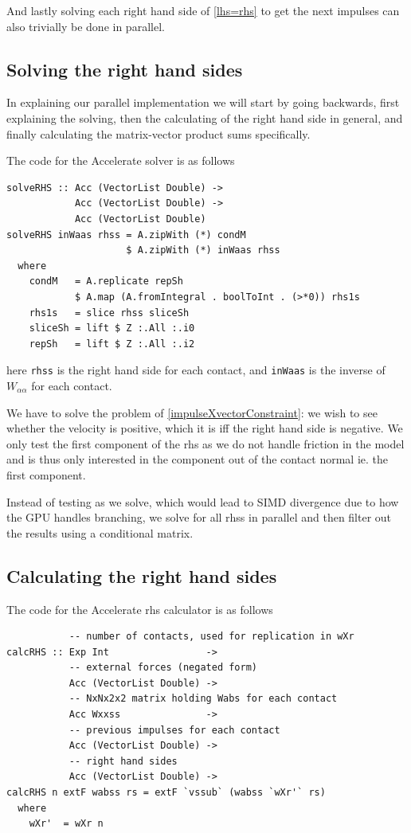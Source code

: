 \documentclass[runningheads,a4paper]{llncs}
\begin{document}
And lastly solving each right hand side of \eqref{lhs=rhs}
to get the next impulses can also trivially be done in parallel.

\subsection{Solving the right hand sides}
In explaining our parallel implementation we will start
by going backwards, first explaining the solving,
then the calculating of the right hand side in general,
and finally calculating the matrix-vector product sums specifically.

The code for the Accelerate solver is as follows
\begin{verbatim}
solveRHS :: Acc (VectorList Double) -> 
            Acc (VectorList Double) -> 
            Acc (VectorList Double)
solveRHS inWaas rhss = A.zipWith (*) condM 
                     $ A.zipWith (*) inWaas rhss
  where
    condM   = A.replicate repSh 
            $ A.map (A.fromIntegral . boolToInt . (>*0)) rhs1s
    rhs1s   = slice rhss sliceSh
    sliceSh = lift $ Z :.All :.i0
    repSh   = lift $ Z :.All :.i2
\end{verbatim}
here \texttt{rhss} is the right hand side for each contact,
and \texttt{inWaas} is the inverse of $W_{\alpha\alpha}$ for each contact.

We have to solve the problem of \eqref{impulseXvectorConstraint}:
we wish to see whether the velocity is positive,
which it is iff the right hand side is negative.
We only test the first component of the rhs
as we do not handle friction in the model and is thus only interested
in the component out of the contact normal ie. the first component.

Instead of testing as we solve,
which would lead to SIMD divergence due to how the GPU handles branching,
we solve for all rhss in parallel and then filter out the results
using a conditional matrix.

\subsection{Calculating the right hand sides}
The code for the Accelerate rhs calculator is as follows
\begin{verbatim}
           -- number of contacts, used for replication in wXr
calcRHS :: Exp Int                 ->
           -- external forces (negated form)
           Acc (VectorList Double) ->
           -- NxNx2x2 matrix holding Wabs for each contact
           Acc Wxxss               ->
           -- previous impulses for each contact
           Acc (VectorList Double) ->
           -- right hand sides
           Acc (VectorList Double) ->
calcRHS n extF wabss rs = extF `vssub` (wabss `wXr'` rs)
  where
    wXr'  = wXr n
\end{verbatim}
\end{document}
